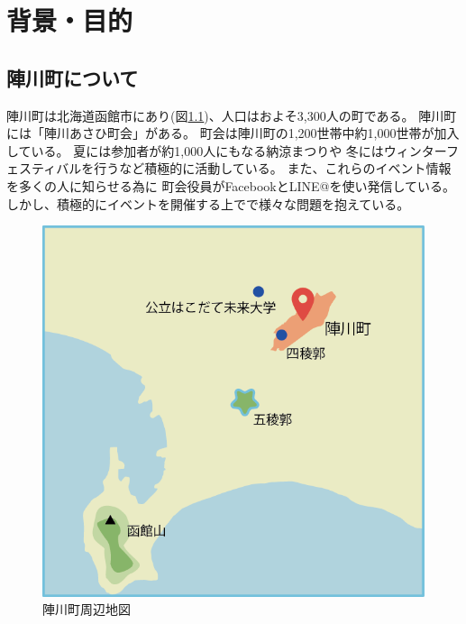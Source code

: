 \chapter{背景・目的}

\section{陣川町について}
陣川町は北海道函館市にあり(図\ref{map})、人口はおよそ3,300人の町である。
陣川町には「陣川あさひ町会」がある。
町会は陣川町の1,200世帯中約1,000世帯が加入している。
夏には参加者が約1,000人にもなる納涼まつりや
冬にはウィンターフェスティバルを行うなど積極的に活動している。
また、これらのイベント情報を多くの人に知らせる為に
町会役員がFacebookとLINE@を使い発信している。
しかし、積極的にイベントを開催する上でで様々な問題を抱えている。
\begin{figure}[h]
    \begin{center}
        \includegraphics[keepaspectratio, scale=0.7]{map.png}
        \caption{陣川町周辺地図}
        \label{map}
    \end{center}
\end{figure}

